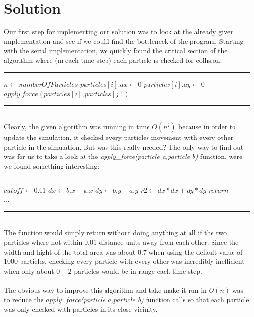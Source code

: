 \documentclass[11pt,a4paper]{article}
\begin{document}
\section{Solution}
Our first step for implementing our solution was to look at the already given implementation and see if we could find the bottleneck of the program. Starting with the serial implementation, we quickly found the critical section of the algorithm where (in each time step) each particle is checked for collision:
\\
\rule{125mm}{0.1pt}
\begin{algorithmic}
\STATE $n \gets numberOfParticles$
	\STATE $particles[i].ax \gets 0$
	\STATE $particles[i].ay \gets 0$
			\STATE $apply\_force(particles[i],particles[j])$
	\ENDFOR
\ENDFOR 
\end{algorithmic}
\rule{125mm}{0.1pt}
\vspace{10pt}
\\
Clearly, the given algorithm was running in time $O(n^{2})$ because in order to update the simulation, it checked every particles movement with every other particle in the simulation. But was this really needed? The only way to find out was for us to take a look at the \emph{apply\_force(particle a,particle b)} function, were we found something interesting:
\\
\rule{125mm}{0.1pt}
\begin{algorithmic}
\STATE $cutoff \gets 0.01$
\STATE $dx \gets b.x - a.x$
\STATE $dy \gets b.y - a.y$
\STATE $r2 \gets dx*dx + dy*dy$
	\STATE $return$
\ENDIF
\\
...
\end{algorithmic}
\rule{125mm}{0.1pt}
\vspace{10pt}
\\
The function would simply return without doing anything at all if the two particles where not within $0.01$ distance units away from each other. Since the width and hight of the total area was about $0.7$ when using the default value of $1000$ particles, checking every particle with every other was incredibly inefficient when only about $0-2$ particles would be in range each time step.
\\
\\
The obvious way to improve this algorithm and take make it run in $O(n)$ was to reduce the \emph{apply\_force(particle a,particle b)} function calls so that each particle was only checked with particles in its close vicinity.
\end{document}
